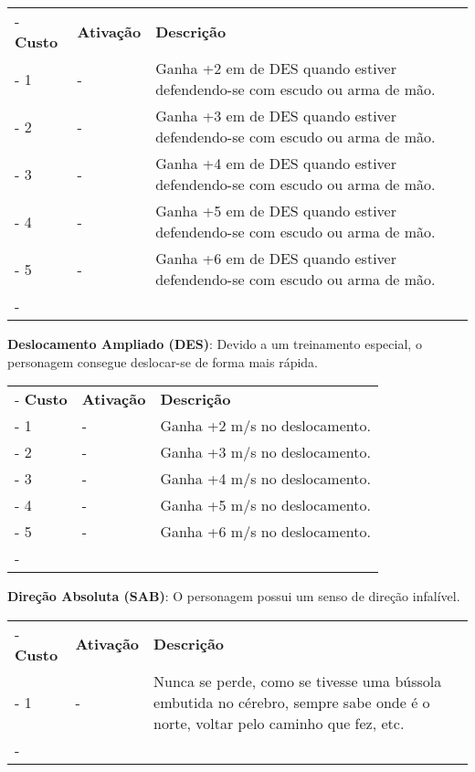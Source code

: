 \begin{small}
	\begin{tabu}{|X[c]|X[c]|X[3]|} \tabucline-
		\textbf{Custo} 	& \textbf{Ativação}	&	\textbf{Descrição} \\ \tabucline-
		1	& 	-		& Ganha +2 em de DES quando estiver defendendo-se com escudo ou arma de mão. \\ \tabucline-
		2	& 	-		& Ganha +3 em de DES quando estiver defendendo-se com escudo ou arma de mão. \\ \tabucline-
		3	& 	-		& Ganha +4 em de DES quando estiver defendendo-se com escudo ou arma de mão. \\ \tabucline-
		4	& 	-		& Ganha +5 em de DES quando estiver defendendo-se com escudo ou arma de mão. \\ \tabucline-
		5	& 	-		& Ganha +6 em de DES quando estiver defendendo-se com escudo ou arma de mão. \\ \tabucline-
	\end{tabu}


\textbf{Deslocamento Ampliado (DES)}: Devido a um treinamento especial, o personagem consegue deslocar-se de forma mais rápida.

	\begin{tabu}{|X[c]|X[c]|X[3]|} \tabucline-
		\textbf{Custo} 	& \textbf{Ativação}	&	\textbf{Descrição} \\ \tabucline-
		1	& 	-		& Ganha +2 m/s no deslocamento. \\ \tabucline-
		2	& 	-		& Ganha +3 m/s no deslocamento. \\ \tabucline-
		3	& 	-		& Ganha +4 m/s no deslocamento. \\ \tabucline-
		4	& 	-		& Ganha +5 m/s no deslocamento. \\ \tabucline-
		5	& 	-		& Ganha +6 m/s no deslocamento. \\ \tabucline-
	\end{tabu}


\textbf{Direção Absoluta (SAB)}: O personagem possui um senso de direção infalível.

	\begin{tabu}{|X[c]|X[c]|X[3]|} \tabucline-
		\textbf{Custo} 	& \textbf{Ativação}	&	\textbf{Descrição} \\ \tabucline-
		1	& 	-		& Nunca se perde, como se tivesse uma bússola embutida no cérebro, sempre sabe onde é o norte, voltar pelo caminho que fez, etc. \\ \tabucline-
	\end{tabu}




\end{small}
